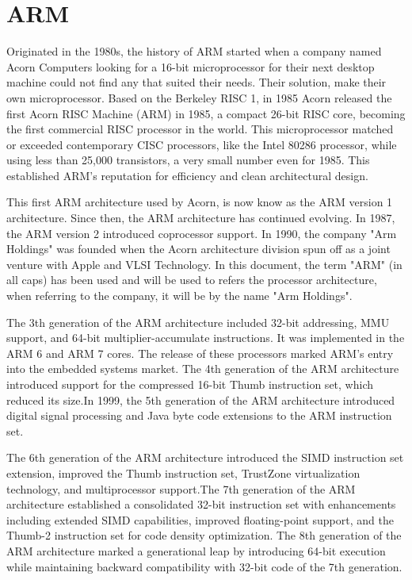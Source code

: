 \section{ARM}
\label{chap:Back_ARM}

Originated in the 1980s, the history of ARM started when a company named 
Acorn Computers looking for a 16-bit microprocessor for their next desktop 
machine could not find any that suited their needs. Their solution, make their own 
microprocessor. Based on the Berkeley RISC 1\cite{WikiBerkeleyRISC2026}, in 1985 Acorn released the 
first Acorn RISC Machine (ARM) in 1985, a compact 26-bit RISC core, becoming the 
first commercial RISC processor in the world. This microprocessor matched or 
exceeded contemporary CISC processors, like the Intel 80286 processor,  while using 
less than 25,000 transistors, a very small number even for 1985. This established 
ARM's reputation for efficiency and clean architectural design.

This first ARM architecture used by Acorn, is now know as the ARM version 
1 architecture. Since then, the ARM architecture has continued evolving. In 1987, 
the ARM version 2 introduced coprocessor support. In 1990, the company 
"Arm Holdings" was founded when the Acorn architecture division spun off as a joint 
venture with Apple and VLSI Technology. In this document, the term "ARM" 
(in all caps) has been used and will be used to refers the processor architecture, when 
referring to the company, it will be by the name "Arm Holdings"\cite{Levy2005}.

The 3th generation of the ARM architecture included 32-bit addressing, MMU 
support, and 64-bit multiplier-accumulate instructions. It was implemented in the 
ARM 6 and ARM 7 cores. The release of these processors marked ARM's entry 
into the embedded systems market. The 4th generation of the ARM architecture 
introduced support for the compressed 16-bit Thumb instruction set, which reduced 
its size.In 1999, the 5th generation of the ARM architecture introduced digital signal 
processing and Java byte code extensions to the ARM instruction set\cite{Dandamudi2005}.

The 6th generation of the ARM architecture introduced the SIMD instruction set 
extension, improved the Thumb instruction set, TrustZone virtualization technology, 
and multiprocessor support.The 7th generation of the ARM architecture established 
a consolidated 32-bit instruction set with enhancements including extended SIMD 
capabilities, improved floating-point support, and the Thumb-2 instruction set for 
code density optimization. The 8th generation of the ARM architecture marked 
a generational leap by introducing 64-bit execution while maintaining backward 
compatibility with 32-bit code of the 7th generation\cite{WikiARMArm2026}.


